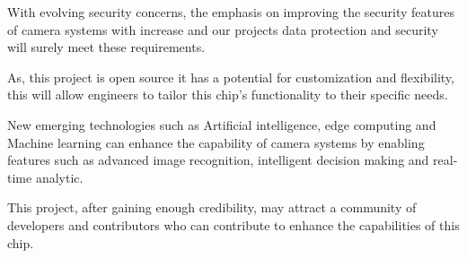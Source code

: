 With evolving security concerns, the emphasis on improving the security features of camera systems with increase and our projects data protection and security will surely meet these requirements.

As, this project is open source it has a potential for customization and flexibility, this will allow engineers to tailor this chip's functionality to their specific needs.

New emerging technologies such as Artificial intelligence, edge computing and Machine learning can enhance the capability of camera systems by enabling features such as advanced image recognition, intelligent decision making and real-time analytic.

This project, after gaining enough credibility, may attract a community of developers and contributors who can contribute to enhance the capabilities of this chip.